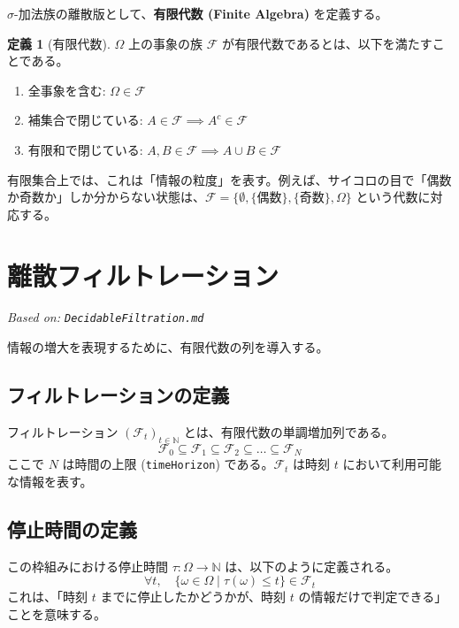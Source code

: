 \documentclass[a4paper,11pt]{ltjsarticle}
\theoremstyle{definition}
\newtheorem{definition}{定義}[section]
\newcommand{\N}{\mathbb{N}}
\newcommand{\OmegaSpace}{\Omega}
\newcommand{\F}{\mathcal{F}}
\newcommand{\Tau}{\tau}
\begin{document}
$\sigma$-加法族の離散版として、\textbf{有限代数 (Finite Algebra)} を定義する。

\begin{definition}[有限代数]
$\OmegaSpace$ 上の事象の族 $\F$ が有限代数であるとは、以下を満たすことである。
\begin{enumerate}
    \item 全事象を含む: $\OmegaSpace \in \F$
    \item 補集合で閉じている: $A \in \F \implies A^c \in \F$
    \item 有限和で閉じている: $A, B \in \F \implies A \cup B \in \F$
\end{enumerate}
\end{definition}

有限集合上では、これは「情報の粒度」を表す。例えば、サイコロの目で「偶数か奇数か」しか分からない状態は、$\F = \{\emptyset, \{偶数\}, \{奇数\}, \OmegaSpace\}$ という代数に対応する。

\section{離散フィルトレーション}
\label{sec:decidable_filtration}
\textit{Based on: \texttt{DecidableFiltration.md}}

情報の増大を表現するために、有限代数の列を導入する。

\subsection{フィルトレーションの定義}
フィルトレーション $(\F_t)_{t \in \N}$ とは、有限代数の単調増加列である。
\[ \F_0 \subseteq \F_1 \subseteq \F_2 \subseteq \dots \subseteq \F_N \]
ここで $N$ は時間の上限 (\texttt{timeHorizon}) である。$\F_t$ は時刻 $t$ において利用可能な情報を表す。

\subsection{停止時間の定義}
この枠組みにおける停止時間 $\Tau: \OmegaSpace \to \N$ は、以下のように定義される。
\[ \forall t, \quad \{\omega \in \OmegaSpace \mid \Tau(\omega) \le t\} \in \F_t \]
これは、「時刻 $t$ までに停止したかどうかが、時刻 $t$ の情報だけで判定できる」ことを意味する。
\end{document}
